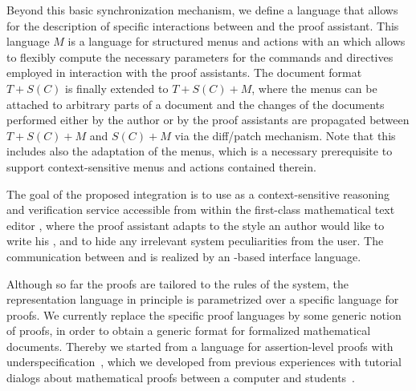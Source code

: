 Beyond this basic synchronization mechanism, we define a language that allows for the
description of specific interactions between {\texmacs} and the proof assistant.  This
language $M$ is a language for structured menus and actions with an
{} which allows to flexibly compute the necessary
parameters for the commands and directives employed in interaction with the proof
assistants. The {\texmacs} document format $T+S(C)$ is finally extended to $T+S(C)+M$,
where the menus can be attached to arbitrary parts of a document and the changes of the
documents performed either by the author or by the proof assistants are propagated between
$T+S(C)+M$ and $S(C)+M$ via the diff/patch mechanism. Note that this includes also the
adaptation of the menus, which is a necessary prerequisite to support context-sensitive
menus and actions contained therein.

The goal of the proposed integration is to use {\OMEGA} as a context-sensitive reasoning
and verification service accessible from within the first-class mathematical text editor
{\texmacs}, where the proof assistant adapts to the style an author would like to write
his {}, and to hide any irrelevant system peculiarities
from the user.  The communication between {\texmacs} and {\OMEGA} is realized by an
{\omdoc}-based interface language.

Although so far the proofs are tailored to the rules of the {\CORE} system, the
representation language in principle is parametrized over a specific language for proofs.
We currently replace the {\CORE} specific proof languages by some generic notion of
proofs, in order to obtain a generic format for formalized mathematical documents.
Thereby we started from a language for assertion-level proofs with
underspecification~\cite{mkmlanguage,AF-05-a}, which we developed from previous
experiences with tutorial dialogs about mathematical proofs between a computer and
students~\cite{dialog}.  


